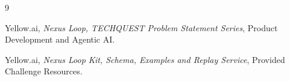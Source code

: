 \documentclass[8pt,twocolumn,a4paper]{extarticle}
\begin{document}

\begin{thebibliography}{9}

Yellow.ai,
\textit{Nexus Loop, TECHQUEST Problem Statement Series},
Product Development and Agentic AI.

Yellow.ai,
\textit{Nexus Loop Kit, Schema, Examples and Replay Service},
Provided Challenge Resources.

\end{thebibliography}
\end{document}

